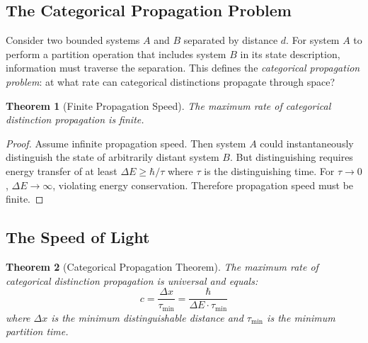 \documentclass[aps,prl,twocolumn,superscriptaddress,floatfix]{revtex4-2}
\newtheorem{theorem}{Theorem}
\begin{document}
\subsection{The Categorical Propagation Problem}

Consider two bounded systems $A$ and $B$ separated by distance $d$. For system $A$ to perform a partition operation that includes system $B$ in its state description, information must traverse the separation. This defines the \emph{categorical propagation problem}: at what rate can categorical distinctions propagate through space?

\begin{theorem}[Finite Propagation Speed]
The maximum rate of categorical distinction propagation is finite.
\end{theorem}

\begin{proof}
Assume infinite propagation speed. Then system $A$ could instantaneously distinguish the state of arbitrarily distant system $B$. But distinguishing requires energy transfer of at least $\Delta E \geq \hbar/\tau$ where $\tau$ is the distinguishing time. For $\tau \to 0$, $\Delta E \to \infty$, violating energy conservation. Therefore propagation speed must be finite.
\end{proof}

\subsection{The Speed of Light}

\begin{theorem}[Categorical Propagation Theorem]
The maximum rate of categorical distinction propagation is universal and equals:
\begin{equation}
c = \frac{\Delta x}{\tau_{\min}} = \frac{\hbar}{\Delta E \cdot \tau_{\min}}
\end{equation}
where $\Delta x$ is the minimum distinguishable distance and $\tau_{\min}$ is the minimum partition time.
\end{theorem}
\end{document}
